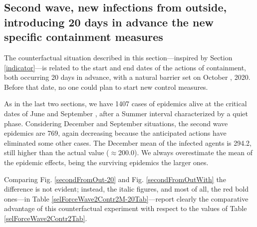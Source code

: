 \documentclass[graybox]{svmult}
\begin{document}
\subsection{Second wave, new infections from outside, introducing 20 days in advance the new specific containment measures}
\label{anticip}

The counterfactual situation described in this section---inspired by Section \ref{indicator}---is related to the start and end dates of the actions of containment, both occurring 20 days in advance, with a natural barrier set on October , 2020. Before that date, no one could plan to start new control measures.

As in the last two sections, we have 1407 cases of epidemics alive at the critical dates of June  and September , after a Summer interval characterized by a quiet phase.
Considering December  and September  situations, the second wave epidemics are 769, again decreasing because the anticipated actions have eliminated some other cases. The December mean of the infected agents is 294.2, still higher than the actual value ($\approx$200.0). We always overestimate the mean of the epidemic effects, being the surviving epidemics the larger ones.


Comparing Fig. \ref{secondFromOut-20} and Fig. \ref{secondFromOutWith} the difference is not evident; instead, the italic figures, and most of all, the red bold ones---in Table \ref{selForceWave2Contr2M-20Tab}---report clearly the comparative advantage of this counterfactual experiment with respect to the values of Table \ref{selForceWave2Contr2Tab}.
\end{document}
